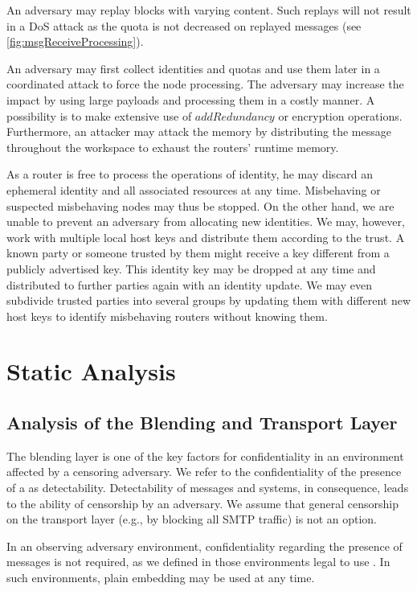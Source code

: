 An adversary may replay blocks with varying content. Such replays will not result in a DoS attack as the quota is not decreased on replayed messages (see \cref{fig:msgReceiveProcessing}).

An adversary may first collect identities and quotas and use them later in a coordinated attack to force the node processing. The adversary may increase the impact by using large payloads and processing them in a costly manner. A possibility is to make extensive use of $addRedundancy$ or encryption operations. Furthermore, an attacker may attack the memory by distributing the message throughout the workspace to exhaust the routers' runtime memory.

As a router is free to process the operations of identity, he may discard an ephemeral identity and all associated resources at any time. Misbehaving or suspected misbehaving nodes may thus be stopped. On the other hand, we are unable to prevent an adversary from allocating new identities. We may, however, work with multiple local host keys and distribute them according to the trust. A known party or someone trusted by them might receive a key different from a publicly advertised key. This identity key may be dropped at any time and distributed to further parties again with an identity update. We may even subdivide trusted parties into several groups by updating them with different new host keys to identify misbehaving routers without knowing them. 

\chapter{Static Analysis}\label{sec:staticAnalysis}
\section{Analysis of the Blending and Transport Layer}\label{sec:analysisBlendingAndTransport}
The blending layer is one of the key factors for confidentiality in an environment affected by a censoring adversary. We refer to the confidentiality of the presence of a \VortexNode{} as detectability. Detectability of messages and systems, in consequence, leads to the ability of censorship by an adversary. We assume that general censorship on the transport layer (e.g., by blocking all SMTP traffic) is not an option.

In an observing adversary environment, confidentiality regarding the presence of messages is not required, as we defined in those environments legal to use \MessageVortex. In such environments, plain embedding may be used at any time.

